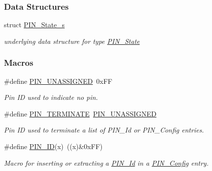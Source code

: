 \subsubsection*{Data Structures}
\begin{DoxyCompactItemize}
\item 
struct \hyperlink{struct_p_i_n___state__s}{P\-I\-N\-\_\-\-State\-\_\-s}
\begin{DoxyCompactList}\small\item\em underlying data structure for type \hyperlink{_p_i_n_8h_a36ef69d50df6baa6973482669c24a522}{P\-I\-N\-\_\-\-State} \end{DoxyCompactList}\end{DoxyCompactItemize}
\subsubsection*{Macros}
\begin{DoxyCompactItemize}
\item 
\#define \hyperlink{_p_i_n_8h_aba219226dfdc9ea2fb82d6a7995395bf}{P\-I\-N\-\_\-\-U\-N\-A\-S\-S\-I\-G\-N\-E\-D}~0x\-F\-F
\begin{DoxyCompactList}\small\item\em Pin I\-D used to indicate no pin. \end{DoxyCompactList}\item 
\#define \hyperlink{_p_i_n_8h_ae22ec44ad92ee130a665ca56aad38c75}{P\-I\-N\-\_\-\-T\-E\-R\-M\-I\-N\-A\-T\-E}~\hyperlink{_p_i_n_8h_aba219226dfdc9ea2fb82d6a7995395bf}{P\-I\-N\-\_\-\-U\-N\-A\-S\-S\-I\-G\-N\-E\-D}
\begin{DoxyCompactList}\small\item\em Pin I\-D used to terminate a list of P\-I\-N\-\_\-\-Id or P\-I\-N\-\_\-\-Config entries. \end{DoxyCompactList}\item 
\#define \hyperlink{_p_i_n_8h_add47c82f7563d28053f76d368d344bc6}{P\-I\-N\-\_\-\-I\-D}(x)~((x)\&0x\-F\-F)
\begin{DoxyCompactList}\small\item\em Macro for inserting or extracting a \hyperlink{_p_i_n_8h_a9ae8197f460bb76ea09a84f47d09921f}{P\-I\-N\-\_\-\-Id} in a \hyperlink{_p_i_n_8h_ae427b7d2925f9b0f3145e455cfdb5841}{P\-I\-N\-\_\-\-Config} entry. \end{DoxyCompactList}\end{DoxyCompactItemize}

